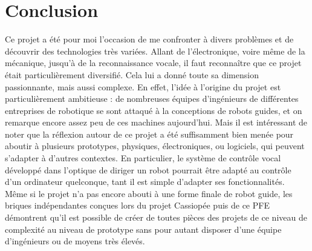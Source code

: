 \documentclass{report}
\begin{document}
\section{Conclusion}
{Ce projet a été pour moi l'occasion de me confronter à divers problèmes et
de découvrir des technologies très variées. Allant de l'électronique, voire même
de la mécanique, jusqu'à de la reconnaissance vocale, il faut reconnaître que ce
projet était particulièrement diversifié. Cela lui a donné toute sa dimension
passionnante, mais aussi complexe. En effet, l'idée à l'origine du projet est
particulièrement ambitieuse : de nombreuses équipes d'ingénieurs de différentes
entreprises de robotique se sont attaqué à la conceptions de robots guides, et
on remarque encore assez peu de ces machines aujourd'hui. Mais il est intéressant
de noter que la réflexion autour de ce projet a été suffisamment bien menée pour
aboutir à plusieurs prototypes, physiques, électroniques, ou logiciels, qui peuvent
s'adapter à d'autres contextes. En particulier, le système de contrôle vocal
développé dans l'optique de diriger un robot pourrait être adapté au contrôle
d'un ordinateur quelconque, tant il est simple d'adapter ses fonctionnalités.
Même si le projet n'a pas encore abouti à une forme finale de robot guide, les
briques indépendantes conçues lors du projet Cassiopée puis de ce PFE démontrent
qu'il est possible de créer de toutes pièces des projets de ce niveau de complexité
au niveau de prototype sans pour autant disposer d'une équipe d'ingénieurs ou de
moyens très élevés.}
\end{document}
